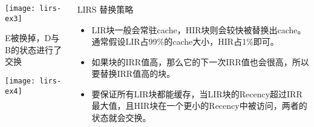 \begin{frame}[plain]
	\frametitle{ }
	\begin{columns}
		\begin{column}{.5\textwidth}
			\centering
			\texttt{[image: lirs-ex3]}
			
			E被换掉，D与B的状态进行了交换 
			
			\texttt{[image: lirs-ex4]}
		\end{column}
		
		\begin{column}{.5\textwidth}
			LIRS 替换策略
			
			\begin{itemize}

				\item  LIR块一般会常驻cache，HIR块则会较快被替换出cache。通常假设LIR占99\%的cache大小，HIR占1\%即可。 
				\item 如果块的IRR值高，那么它的下一次IRR值也会很高，所以要替换IRR值高的块。
				\item 要保证所有LIR块都能缓存，当LIR块的Recency超过IRR最大值，且HIR块在一个更小的Recency中被访问，两者的状态就会交换。
				
				
			\end{itemize}
			
		\end{column}
		
		
	\end{columns}
\end{frame}




